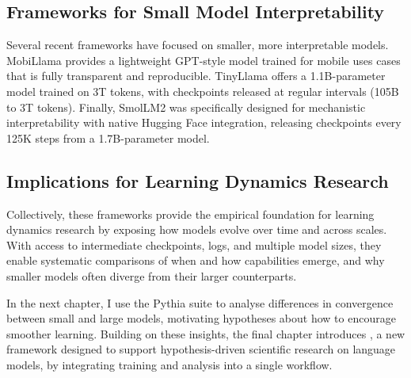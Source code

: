 \subsection{Frameworks for Small Model Interpretability}

Several recent frameworks have focused on smaller, more interpretable models. MobiLlama \citep{thawakar2024mobillama} provides a lightweight GPT-style model trained for mobile uses cases that is fully transparent and reproducible. TinyLlama \citep{liu2023llm360} offers a 1.1B-parameter model trained on 3T tokens, with checkpoints released at regular intervals (105B to 3T tokens). Finally, SmolLM2 \citep{allal2025smollm2} was specifically designed for mechanistic interpretability with native Hugging Face integration, releasing checkpoints every 125K steps from a 1.7B-parameter model. 

\subsection{Implications for Learning Dynamics Research}

Collectively, these frameworks provide the empirical foundation for learning dynamics research by exposing how models evolve over time and across scales. With access to intermediate checkpoints, logs, and multiple model sizes, they enable systematic comparisons of when and how capabilities emerge, and why smaller models often diverge from their larger counterparts.

In the next chapter, I use the Pythia suite to analyse differences in convergence between small and large models, motivating hypotheses about how to encourage smoother learning. Building on these insights, the final chapter introduces \pico, a new framework designed to support hypothesis-driven scientific research on language models, by integrating training and analysis into a single workflow.